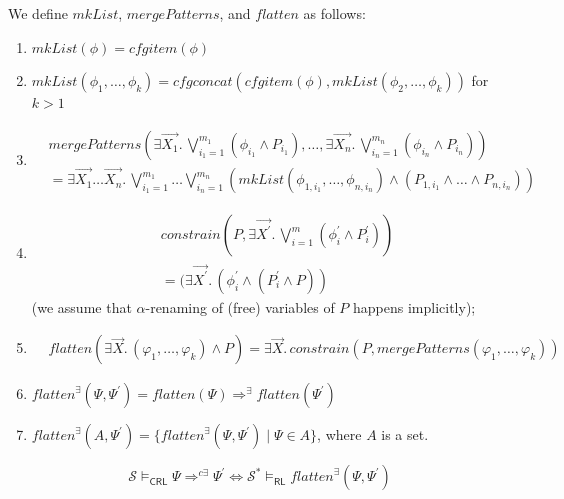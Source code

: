 \documentclass{article}
\newcommand{\RL}{\mathsf{RL}}
\newcommand{\CRL}{\mathsf{CRL}}
\begin{document}
\begin{definition}
We define $\mathit{mkList}$, $\mathit{mergePatterns}$, and $\mathit{flatten}$ as follows:
\begin{enumerate}
    \item $\mathit{mkList}(\phi) = \mathit{cfgitem}(\phi)$
    \item $\mathit{mkList}(\phi_1, \ldots, \phi_k) = \mathit{cfgconcat}(\mathit{cfgitem}(\phi), \mathit{mkList}(\phi_2, \ldots, \phi_k))$ for $k > 1$
    \item
    \begin{align*}
     & \mathit{mergePatterns}(\exists \vec{X_1}.\, \bigvee_{i_{1}=1}^{m_1} (\phi_{i_1} \land P_{i_1}),
     \ldots, \exists \vec{X_n}.\, \bigvee_{i_{n}=1}^{m_n} (\phi_{i_n} \land P_{i_n}))
     \\ & = \exists \vec{X_1}\ldots\vec{X_n}.\, \bigvee_{i_{1}=1}^{m_1} \ldots \bigvee_{i_{n}=1}^{m_n}
       (\mathit{mkList}(\phi_{1, i_1}, \ldots, \phi_{n, i_n}) \land (P_{1, i_1} \land \ldots \land P_{n, i_n}))
    \end{align*}
    \item
        \begin{align*}
            & \mathit{constrain}(P, \exists \vec{X^\prime} .\,
            \bigvee_{i=1}^{m} (\phi^\prime_i \land P^\prime_i))
            \\& = (\exists \vec{X^\prime}.\, (\phi^\prime_i \land (P^\prime_i \land P))
    \end{align*}
    (we assume that $\alpha$-renaming of (free) variables of $P$ happens implicitly);
    \item
        \begin{align*}
            & \mathit{flatten}(\exists \vec{X}.\, (\varphi_1, \ldots, \varphi_k) \land P)
            = \exists \vec{X}.\, \mathit{constrain}(P, \mathit{mergePatterns}(\varphi_1, \ldots, \varphi_k))
    \end{align*}
    \item $\mathit{flatten}^\exists(\Psi, \Psi^\prime) = \mathit{flatten}(\Psi) \Rightarrow^\exists \mathit{flatten}(\Psi^\prime)$
    \item $\mathit{flatten}^\exists(A, \Psi^\prime) = \{ \mathit{flatten}^\exists(\Psi, \Psi^\prime) \mid \Psi \in A \}$, where $A$ is a set.
\end{enumerate}
\end{definition}

\begin{theorem}\label{thm:correspondence}
\begin{equation*}
\mathcal{S} \vDash_{\CRL} \Psi \Rightarrow^{c\exists} \Psi^\prime \iff \mathcal{S}^* \vDash_\RL \mathit{flatten}^\exists(\Psi, \Psi^\prime)
\end{equation*}
\end{theorem}
\end{document}
